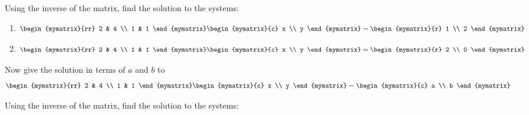 \begin{enumialphparenastyle}
\begin{ex}Using the inverse of the matrix, find the solution to the systems:
\begin{enumerate}
\item
\begin{equation*}
\begin{mymatrix}{rr}
2 & 4  \\
1 & 1 
\end{mymatrix} 
\begin{mymatrix}{c}
x \\
y
\end{mymatrix} =\begin{mymatrix}{r}
1 \\
2 
\end{mymatrix}
\end{equation*}

\item
\begin{equation*}
\begin{mymatrix}{rr}
2 & 4 \\
1 & 1 
\end{mymatrix} \begin{mymatrix}{c}
x \\
y 
\end{mymatrix} =\begin{mymatrix}{r}
2 \\
0 
\end{mymatrix} 
\end{equation*}
\end{enumerate}

Now give the solution in terms of $a$ and $b$ to
\[
\begin{mymatrix}{rr}
2 & 4 \\
1 & 1 
\end{mymatrix}
\begin{mymatrix}{c}
x \\
y
\end{mymatrix}
=
\begin{mymatrix}{c}
a \\
b
\end{mymatrix}
\]
\end{ex}

\begin{ex}Using the inverse of the matrix, find the solution to the systems: 


\end{ex}
\end{enumialphparenastyle}
